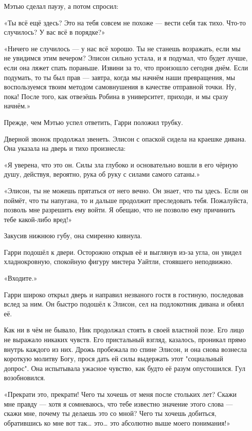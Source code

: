 \documentclass[a4paper,12pt]{book}
\begin{document}
\par
Мэтью сделал паузу, а потом спросил:
\par
«Ты всё ещё здесь? Это на тебя совсем не похоже — вести себя так тихо. Что-то случилось? У вас всё в порядке?»
\par
«Ничего не случилось — у нас всё хорошо. Ты не станешь возражать, если мы не увидимся этим вечером? Элисон сильно устала, и я подумал, что будет лучше, если она ляжет спать пораньше. Извини за то, что произошло сегодня днём. Если подумать, то ты был прав — завтра, когда мы начнём наши превращения, мы воспользуемся твоим методом самовнушения в качестве отправной точки. Ну, пока! После того, как отвезёшь Робина в университет, приходи, и мы сразу начнём.»
\par
Прежде, чем Мэтью успел ответить, Гарри положил трубку.
\par
Дверной звонок продолжал звенеть. Элисон с опаской сидела на краешке дивана. Она указала на дверь и тихо произнесла:
\par
«Я уверена, что это он. Силы зла глубоко и основательно вошли в его чёрную душу, действуя, вероятно, рука об руку с силами самого сатаны.»
\par
«Элисон, ты не можешь прятаться от него вечно. Он знает, что ты здесь. Если он поймёт, что ты напугана, то и дальше продолжит преследовать тебя. Пожалуйста, позволь мне разрешить ему войти. Я обещаю, что не позволю ему причинить тебе какой-либо вред!»
\par
Закусив нижнюю губу, она смиренно кивнула.
\par
Гарри подошёл к двери. Осторожно открыв её и выглянув из-за угла, он увидел хладнокровную, спокойную фигуру мистера Уайтли, стоявшего неподвижно.\\
\par
«Входите.»
\par
Гарри широко открыл дверь и направил незваного гостя в гостиную, последовав вслед за ним. Он быстро подошёл к Элисон, сел на подлокотник дивана и обнял её.
\par
Как ни в чём не бывало, Ник продолжал стоять в своей властной позе. Его лицо не выражало никаких чувств. Его пристальный взгляд, казалось, проникал прямо внутрь каждого из них. Дрожь пробежала по спине Элисон, и она снова вознесла короткую молитву Богу, прося дать ей силы выдержать этот "социальный допрос". Она испытывала ужасное чувство, как будто её разум опустошился. Гул возобновился.
\par
«Прекрати это, прекрати! Чего ты хочешь от меня после стольких лет? Скажи мне правду — хотя я сомневаюсь, что тебе известно значение этого слова — скажи мне, почему ты делаешь это со мной? Чего ты хочешь добиться, обратившись ко мне вот так… это… это абсолютно выше моего понимания!»
\end{document}
